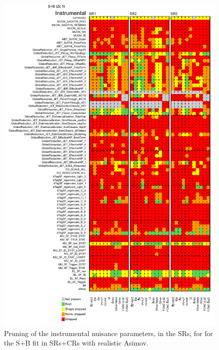 \begin{figure}[htbp]
	\centering
	\includegraphics[width=.9\textwidth]{Chapters/CH8/figures/SPLUSB_CRSR_UsingDL1rcFullSys/pruning_split1}
	\caption{Pruning of the instrumental nuisance parameters, in the SRs, for for the S+B \tZc fit in SRs+CRs with realistic Asimov.}%
	\label{fig:stat:tzc:splusb:crsr:pruning1}
\end{figure}
